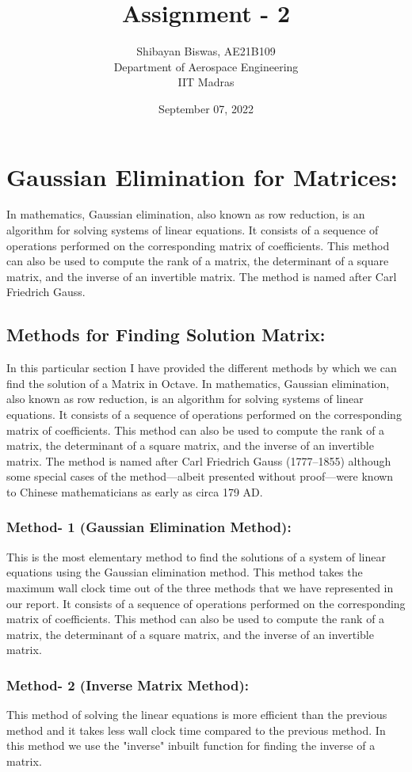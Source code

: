 \documentclass[12pt,a4paper]{article}
\author{Shibayan Biswas, AE21B109\\ Department of Aerospace Engineering\\ IIT Madras}
\title{Assignment - 2}
\date{September 07, 2022}
\begin{document}
\maketitle
\hline
\section{Gaussian Elimination for Matrices:}
In mathematics, Gaussian elimination, also known as row reduction, is an algorithm for solving systems of linear equations. It consists of a sequence of operations performed on the corresponding matrix of coefficients. This method can also be used to compute the rank of a matrix, the determinant of a square matrix, and the inverse of an invertible matrix. The method is named after Carl Friedrich Gauss.  
\subsection{Methods for Finding Solution Matrix:}
In this particular section I have provided the different methods by which we can find the solution of a Matrix in Octave. In mathematics, Gaussian elimination, also known as row reduction, is an algorithm for solving systems of linear equations. It consists of a sequence of operations performed on the corresponding matrix of coefficients. This method can also be used to compute the rank of a matrix, the determinant of a square matrix, and the inverse of an invertible matrix. The method is named after Carl Friedrich Gauss (1777–1855) although some special cases of the method—albeit presented without proof—were known to Chinese mathematicians as early as circa 179 AD.
\subsubsection{Method- 1 (Gaussian Elimination Method):}
This is the most elementary method to find the solutions of a system of linear equations using the Gaussian elimination method. This method takes the maximum wall clock time out of the three methods that we have represented in our report. It consists of a sequence of operations performed on the corresponding matrix of coefficients. This method can also be used to compute the rank of a matrix, the determinant of a square matrix, and the inverse of an invertible matrix.
\subsubsection{Method- 2 (Inverse Matrix Method):}
This method of solving the linear equations is more efficient than the previous method and it takes less wall clock time compared to the previous method. In this method we use the "inverse" inbuilt function for finding the inverse of a matrix.\\
\end{document}
